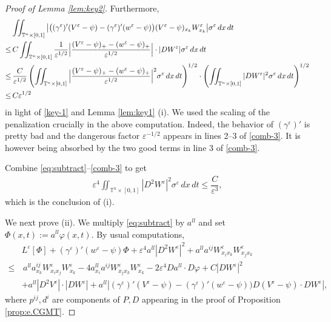 \documentclass[12pt,reqno]{amsart}
\theoremstyle{plain}
\theoremstyle{remark}
\numberwithin{equation}{section}
\begin{document}
\begin{proof}[Proof of Lemma {\rm\ref{lem:key2}}]
Furthermore,
\begin{align}
&
\iint_{{\mathbb{T}}^n\times[0,1]}
\big|\big(({\gamma}^{\varepsilon})'(V^{\varepsilon}-\psi)-({\gamma}^{\varepsilon})'(w^{\varepsilon}-\psi)\big)(V^{\varepsilon}-\psi)_{x_k}W^{\varepsilon}_{x_k}\big|{\sigma}^{\varepsilon}\,dx\,dt \notag\\
\leq&\,
C\iint_{{\mathbb{T}}^n\times[0,1]}
\frac{1}{{\varepsilon}^{1/2}}\Big|\frac{(V^{\varepsilon}-\psi)_{+}-(w^{\varepsilon}-\psi)_{+}}{{\varepsilon}^{1/2}}\Big|\cdot|DW^{\varepsilon}|{\sigma}^{\varepsilon}\,dx\,dt\notag\\
\le&\,
\frac{C}{{\varepsilon}^{1/2}}
\left(\iint_{{\mathbb{T}}^n\times[0,1]}
\Big|\frac{(V^{\varepsilon}-\psi)_{+}-(w^{\varepsilon}-\psi)_{+}}{{\varepsilon}^{1/2}}\Big|^2{\sigma}^{\varepsilon}\,dx\,dt\right)^{1/2}
\cdot\left(\iint_{{\mathbb{T}}^n\times[0,1]}
|DW^{\varepsilon}|^2{\sigma}^{\varepsilon}\,dx\,dt\right)^{1/2}\notag\\
\le&\,
C{\varepsilon}^{1/2} \label{comb-3}
\end{align}
in light of \eqref{key-1} and Lemma \ref{lem:key1} (i). 
We used the scaling of the penalization crucially in the above computation. Indeed,
the behavior of $({\gamma}^{\varepsilon})'$ is pretty bad 
and the dangerous factor ${\varepsilon}^{-1/2}$ appears in lines 2--3 of \eqref{comb-3}.
It is however being absorbed by the two good terms in line 3 of \eqref{comb-3}.

Combine \eqref{eq:subtract}--\eqref{comb-3} to get
\begin{align*}
{\varepsilon}^4 \iint_{{\mathbb{T}}^n\times[0,1]} |D^2W^{\varepsilon}|^2 {\sigma}^{\varepsilon}\,dx\,dt 
\le  \dfrac{C}{{\varepsilon}^3},
\end{align*}
which is the conclusion of (i). 
\smallskip

We next prove (ii). 
We multiply \eqref{eq:subtract} by $a^{ll}$ and set 
$\Phi(x,t):=a^{ll}\varphi(x,t)$. By usual computations,
\begin{align*}
&L^{\varepsilon}[\Phi]+({\gamma}^{\varepsilon})'(w^{\varepsilon}-\psi)\Phi+{\varepsilon}^4a^{ll}|D^2W^{\varepsilon}|^2+a^{ll}a^{ij}W^{\varepsilon}_{x_ix_k}W^{\varepsilon}_{x_jx_k}\\
\le&\,
a^{ll}a^{ij}_{x_k}W^{\varepsilon}_{x_ix_j}W^{\varepsilon}_{x_k}-4a^{ll}_{x_i}a^{ij}W^{\varepsilon}_{x_jx_k}W^{\varepsilon}_{x_k}-2{\varepsilon}^4Da^{ll}\cdot D\varphi
+C|DW^{\varepsilon}|^2\\
&+a^{ll} |D^2V^{\varepsilon}|\cdot |DW^{\varepsilon}|+
a^{ll}
\left|({\gamma}^{\varepsilon})'(V^{\varepsilon}-\psi)-({\gamma}^{\varepsilon})'(w^{\varepsilon}-\psi)\big)
D(V^{\varepsilon}-\psi)\cdot DW^{\varepsilon}\right|,  
\end{align*}
where $p^{ij}, d^{i}$ are components of $P, D$ appearing  
in the proof of Proposition \ref{prop:e.CGMT}. 


\end{proof}
\end{document}
